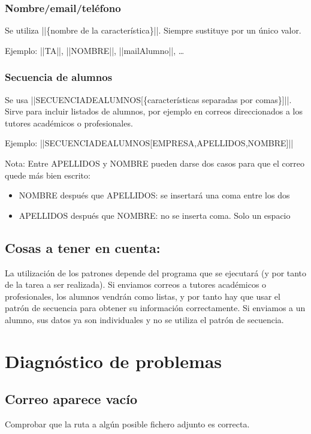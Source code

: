 \documentclass[11pt]{article}
\begin{document}
\subsubsection{Nombre/email/teléfono}
\label{sec-4-2-1}
Se utiliza ||\{nombre de la característica\}||. Siempre sustituye por un único valor.

Ejemplo: ||TA||, ||NOMBRE||, ||mailAlumno||, \ldots{}
\subsubsection{Secuencia de alumnos}
\label{sec-4-2-2}
Se usa ||SECUENCIADEALUMNOS[\{características separadas por comas\}]||. Sirve para incluir listados de alumnos, por ejemplo en correos direccionados a los tutores académicos o profesionales.

Ejemplo: ||SECUENCIADEALUMNOS[EMPRESA,APELLIDOS,NOMBRE]||

Nota: Entre APELLIDOS y NOMBRE pueden darse dos casos para que el correo quede más bien escrito:
\begin{itemize}
\item NOMBRE después que APELLIDOS: se insertará una coma entre los dos
\item APELLIDOS después que NOMBRE: no se inserta coma. Solo un espacio
\end{itemize}
\subsection{Cosas a tener en cuenta:}
\label{sec-4-3}
La utilización de los patrones depende del programa que se ejecutará (y por tanto de la tarea a ser realizada). Si enviamos correos a tutores académicos o profesionales, los alumnos vendrán como listas, y por tanto hay que usar el patrón de secuencia para obtener su información correctamente. Si enviamos a un alumno, sus datos ya son individuales y no se utiliza el patrón de secuencia.

\section{Diagnóstico de problemas}
\label{sec-5}
\subsection{Correo aparece vacío}
\label{sec-5-1}
Comprobar que la ruta a algún posible fichero adjunto es correcta.
\end{document}
